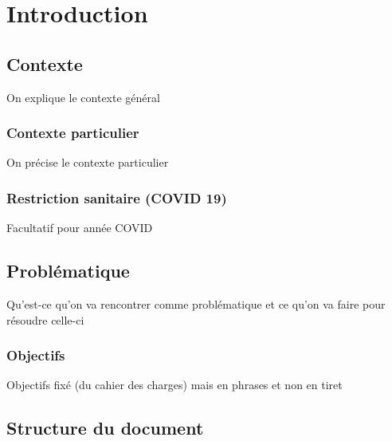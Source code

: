 \chapter*{Introduction}

\section*{Contexte}
On explique le contexte général
\subsection*{Contexte particulier}
On précise le contexte particulier
\subsection*{Restriction sanitaire (COVID 19)}
Facultatif pour année COVID

\section*{Problématique}
Qu'est-ce qu'on va rencontrer comme problématique et ce qu'on va faire pour résoudre celle-ci
\subsection*{Objectifs}
Objectifs fixé (du cahier des charges) mais en phrases et non en tiret
\section*{Structure du document}